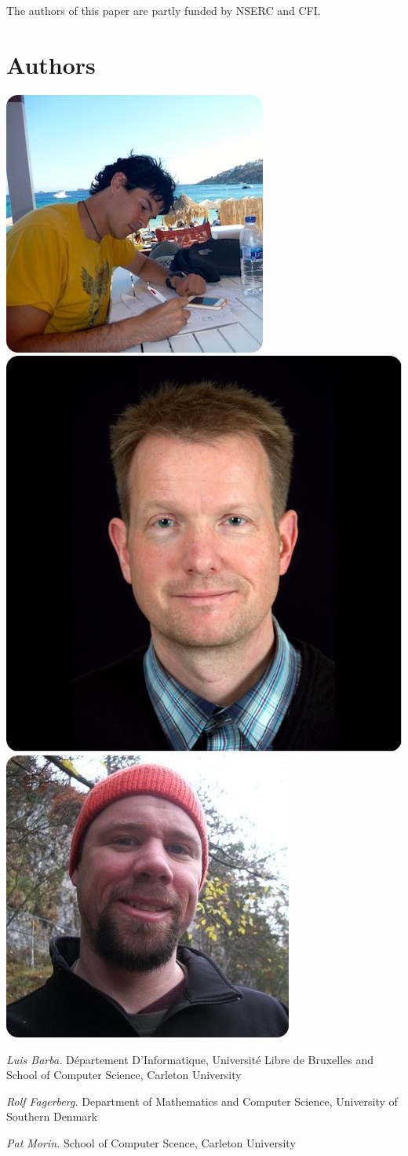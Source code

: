 \documentclass{patmorin}
\begin{document}
The authors of this paper are partly funded by NSERC and CFI.




\newpage

\section*{Authors}

\noindent
\includegraphics[width=.3\textwidth]{luis-b}%
\hspace{.05\textwidth}%
\includegraphics[width=.3\textwidth]{rolf-b}%
\hspace{.05\textwidth}%
\includegraphics[width=.3\textwidth]{pat-b}%

\noindent\emph{Luis Barba.}
D\'epartement D'Informatique, Universit\'e Libre de Bruxelles
and
School of Computer Science, Carleton University

\noindent\emph{Rolf Fagerberg.}
Department of Mathematics and Computer Science, University of Southern Denmark

\noindent\emph{Pat Morin.}
School of Computer Scence, Carleton University
\end{document}
